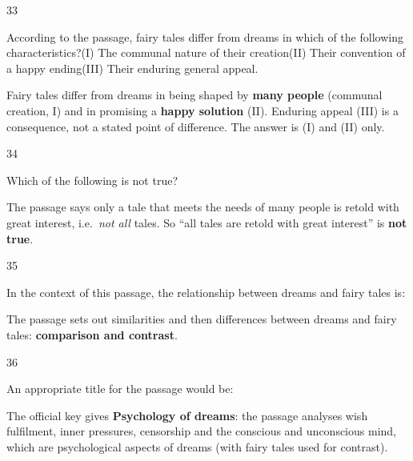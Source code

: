 \begin{question}{33}
{According to the passage, fairy tales differ from dreams in which of the following characteristics?\newline (I) The communal nature of their creation\newline (II) Their convention of a happy ending\newline (III) Their enduring general appeal.\par}
\begin{explain}
Fairy tales differ from dreams in being shaped by \textbf{many people} (communal creation, I) and in promising a \textbf{happy solution} (II). Enduring appeal (III) is a consequence, not a stated point of difference. The answer is (I) and (II) only.
\end{explain}
\end{question}

\begin{question}{34}
{Which of the following is not true?\par}
\begin{explain}
The passage says only a tale that meets the needs of many people is retold with great interest, i.e.\ \emph{not all} tales. So ``all tales are retold with great interest'' is \textbf{not true}.
\end{explain}
\end{question}

\begin{question}{35}
{In the context of this passage, the relationship between dreams and fairy tales is:\par}
\begin{explain}
The passage sets out similarities and then differences between dreams and fairy tales: \textbf{comparison and contrast}.
\end{explain}
\end{question}

\begin{question}{36}
{An appropriate title for the passage would be:\par}
\begin{explain}
The official key gives \textbf{Psychology of dreams}: the passage analyses wish fulfilment, inner pressures, censorship and the conscious and unconscious mind, which are psychological aspects of dreams (with fairy tales used for contrast).
\end{explain}
\end{question}

